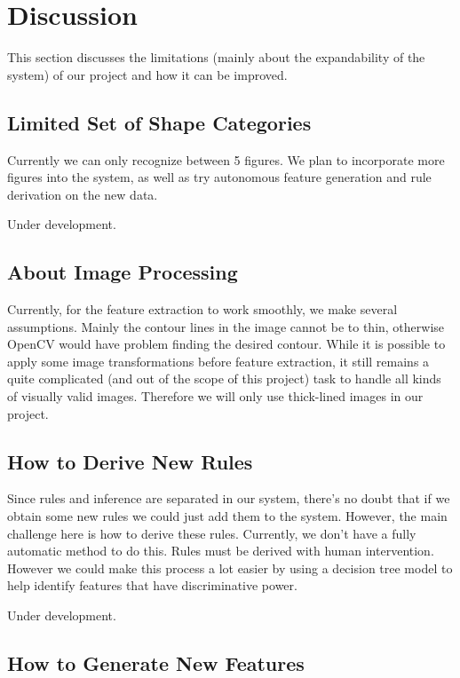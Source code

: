 \section{Discussion}

This section discusses the limitations (mainly about the expandability of the system) of our project and how it can be improved.

\subsection{Limited Set of Shape Categories}

Currently we can only recognize between 5 figures. We plan to incorporate more figures into the system, as well as try autonomous feature generation and rule derivation on the new data.

Under development.

\subsection{About Image Processing}

Currently, for the feature extraction to work smoothly, we make several assumptions. Mainly the contour lines in the image cannot be to thin, otherwise OpenCV would have problem finding the desired contour. While it is possible to apply some image transformations before feature extraction, it still remains a quite complicated (and out of the scope of this project) task to handle all kinds of visually valid images. Therefore we will only use thick-lined images in our project.

\subsection{How to Derive New Rules}

Since rules and inference are separated in our system, there's no doubt that if we obtain some new rules we could just add them to the system. However, the main challenge here is how to derive these rules. Currently, we don't have a fully automatic method to do this. Rules must be derived with human intervention. However we could make this process a lot easier by using a decision tree model to help identify features that have discriminative power. 

Under development.

\subsection{How to Generate New Features}

